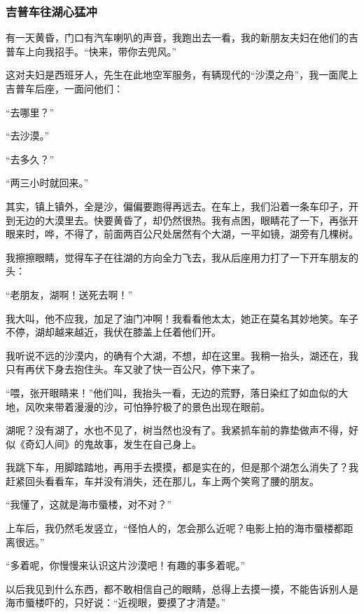 \subsubsection*{吉普车往湖心猛冲}
\par 有一天黄昏，门口有汽车喇叭的声音，我跑出去一看，我的新朋友夫妇在他们的吉普车上向我招手。“快来，带你去兜风。”
\par 这对夫妇是西班牙人，先生在此地空军服务，有辆现代的“沙漠之舟”，我一面爬上吉普车后座，一面问他们：
\par “去哪里？”
\par “去沙漠。”
\par “去多久？”
\par “两三小时就回来。”
\par 其实，镇上镇外，全是沙，偏偏要跑得再远去。在车上，我们沿着一条车印子，开到无边的大漠里去。快要黄昏了，却仍然很热。我有点困，眼睛花了一下，再张开眼来时，哗，不得了，前面两百公尺处居然有个大湖，一平如镜，湖旁有几棵树。
\par 我擦擦眼睛，觉得车子在往湖的方向全力飞去，我从后座用力打了一下开车朋友的头：
\par “老朋友，湖啊！送死去啊！”
\par 我大叫，他不应我，加足了油门冲啊！我看看他太太，她正在莫名其妙地笑。车子不停，湖却越来越近，我伏在膝盖上任着他们开。
\par 我听说不远的沙漠内，的确有个大湖，不想，却在这里。我稍一抬头，湖还在，我只有再伏下身去抱住头。车又驶了快一百公尺，停下来了。
\par “喂，张开眼睛来！”他们叫，我抬头一看，无边的荒野，落日染红了如血似的大地，风吹来带着漫漫的沙，可怕狰狞极了的景色出现在眼前。
\par 湖呢？没有湖了，水也不见了，树当然也没有了。我紧抓车前的靠垫做声不得，好似《奇幻人间》的鬼故事，发生在自己身上。
\par 我跳下车，用脚踏踏地，再用手去摸摸，都是实在的，但是那个湖怎么消失了？我赶紧回头看看车，车并没有消失，还在那儿，车上两个笑弯了腰的朋友。
\par “我懂了，这就是海市蜃楼，对不对？”
\par 上车后，我仍然毛发竖立，“怪怕人的，怎会那么近呢？电影上拍的海市蜃楼都距离很远。”
\par “多着呢，你慢慢来认识这片沙漠吧！有趣的事多着呢。”
\par 以后我见到什么东西，都不敢相信自己的眼睛，总得上去摸一摸，不能告诉别人是海市蜃楼吓的，只好说：“近视眼，要摸了才清楚。”
